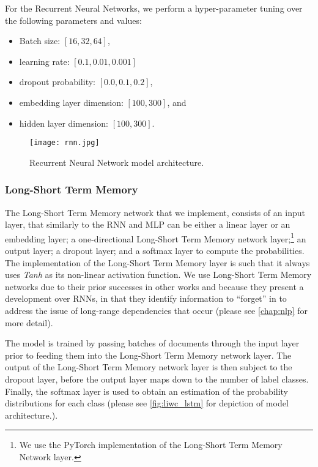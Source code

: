 For the Recurrent Neural Networks, we perform a hyper-parameter tuning over the following parameters and values:

\begin{itemize}
  \item Batch size: $[16, 32, 64]$,
  \item learning rate: $[0.1, 0.01, 0.001]$
  \item dropout probability: $[0.0, 0.1, 0.2]$,
  \item embedding layer dimension: $[100, 300]$, and
  \item hidden layer dimension: $[100, 300]$.
\end{itemize}

\begin{figure}
  \centering
  \texttt{[image: rnn.jpg]}
  \caption{Recurrent Neural Network model architecture.}
  \label{fig:liwc_rnn}
\end{figure}

\subsubsection{Long-Short Term Memory}

The Long-Short Term Memory network that we implement, consists of an input layer, that similarly to the RNN and MLP can be either a linear layer or an embedding layer; a one-directional Long-Short Term Memory network layer;\footnote{We use the PyTorch implementation of the Long-Short Term Memory Network layer.} an output layer; a dropout layer; and a softmax layer to compute the probabilities. The implementation of the Long-Short Term Memory layer is such that it always uses \textit{Tanh} as its non-linear activation function. We use Long-Short Term Memory networks due to their prior successes in other works \cite{CITE: LSTM papers} and because they present a development over RNNs, in that they identify information to ``forget'' in to address the issue of long-range dependencies that occur (please see \autoref{chap:nlp} for more detail).

The model is trained by passing batches of documents through the input layer prior to feeding them into the Long-Short Term Memory network layer. The output of the Long-Short Term Memory network layer is then subject to the dropout layer, before the output layer maps down to the number of label classes. Finally, the softmax layer is used to obtain an estimation of the probability distributions for each class (please see \autoref{fig:liwc_lstm} for depiction of model architecture.).

